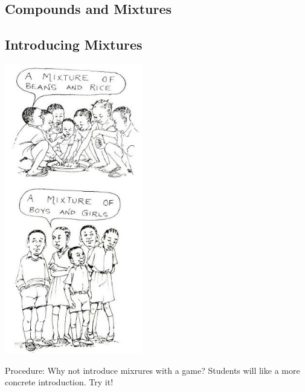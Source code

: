 \begin{multicols}{2}
\vfill
\columnbreak


\section*{Compounds and Mixtures}


\subsection{Introducing Mixtures}

\begin{center}
\includegraphics[width=0.45\textwidth]{./img/source/intro-mixtures.jpg}
\end{center}

\begin{description*}
\item[Procedure:]{Why not introduce mixrures with a
game? Students will like a more concrete
introduction. Try it!}
\end{description*}


\end{multicols}
